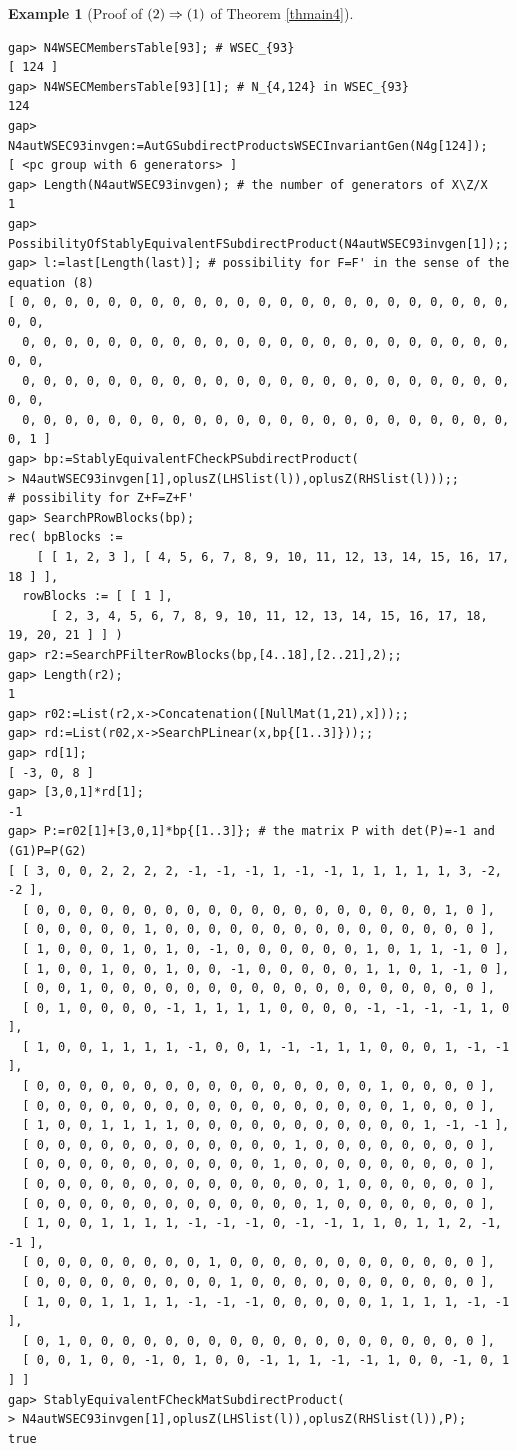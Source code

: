 \documentclass{amsart}
\theoremstyle{plain}
\theoremstyle{definition}
\newtheorem{example}[theorem]{Example}
\theoremstyle{remark}
\begin{document}
\begin{example}[Proof of ${\rm (2)}\Rightarrow {\rm (1)}$ of {Theorem \ref{thmain4}}]
\begin{verbatim}
gap> N4WSECMembersTable[93]; # WSEC_{93}
[ 124 ]
gap> N4WSECMembersTable[93][1]; # N_{4,124} in WSEC_{93}
124
gap> N4autWSEC93invgen:=AutGSubdirectProductsWSECInvariantGen(N4g[124]);
[ <pc group with 6 generators> ]
gap> Length(N4autWSEC93invgen); # the number of generators of X\Z/X
1
gap> PossibilityOfStablyEquivalentFSubdirectProduct(N4autWSEC93invgen[1]);;
gap> l:=last[Length(last)]; # possibility for F=F' in the sense of the equation (8)
[ 0, 0, 0, 0, 0, 0, 0, 0, 0, 0, 0, 0, 0, 0, 0, 0, 0, 0, 0, 0, 0, 0, 0, 0, 0, 
  0, 0, 0, 0, 0, 0, 0, 0, 0, 0, 0, 0, 0, 0, 0, 0, 0, 0, 0, 0, 0, 0, 0, 0, 0, 
  0, 0, 0, 0, 0, 0, 0, 0, 0, 0, 0, 0, 0, 0, 0, 0, 0, 0, 0, 0, 0, 0, 0, 0, 0, 
  0, 0, 0, 0, 0, 0, 0, 0, 0, 0, 0, 0, 0, 0, 0, 0, 0, 0, 0, 0, 0, 0, 0, 0, 1 ]
gap> bp:=StablyEquivalentFCheckPSubdirectProduct(
> N4autWSEC93invgen[1],oplusZ(LHSlist(l)),oplusZ(RHSlist(l)));;
# possibility for Z+F=Z+F'
gap> SearchPRowBlocks(bp);
rec( bpBlocks := 
    [ [ 1, 2, 3 ], [ 4, 5, 6, 7, 8, 9, 10, 11, 12, 13, 14, 15, 16, 17, 18 ] ],
  rowBlocks := [ [ 1 ], 
      [ 2, 3, 4, 5, 6, 7, 8, 9, 10, 11, 12, 13, 14, 15, 16, 17, 18, 19, 20, 21 ] ] )
gap> r2:=SearchPFilterRowBlocks(bp,[4..18],[2..21],2);;
gap> Length(r2);
1
gap> r02:=List(r2,x->Concatenation([NullMat(1,21),x]));;
gap> rd:=List(r02,x->SearchPLinear(x,bp{[1..3]}));;
gap> rd[1];
[ -3, 0, 8 ]
gap> [3,0,1]*rd[1];
-1
gap> P:=r02[1]+[3,0,1]*bp{[1..3]}; # the matrix P with det(P)=-1 and (G1)P=P(G2)
[ [ 3, 0, 0, 2, 2, 2, 2, -1, -1, -1, 1, -1, -1, 1, 1, 1, 1, 1, 3, -2, -2 ], 
  [ 0, 0, 0, 0, 0, 0, 0, 0, 0, 0, 0, 0, 0, 0, 0, 0, 0, 0, 0, 1, 0 ], 
  [ 0, 0, 0, 0, 0, 1, 0, 0, 0, 0, 0, 0, 0, 0, 0, 0, 0, 0, 0, 0, 0 ], 
  [ 1, 0, 0, 0, 1, 0, 1, 0, -1, 0, 0, 0, 0, 0, 0, 1, 0, 1, 1, -1, 0 ], 
  [ 1, 0, 0, 1, 0, 0, 1, 0, 0, -1, 0, 0, 0, 0, 0, 1, 1, 0, 1, -1, 0 ], 
  [ 0, 0, 1, 0, 0, 0, 0, 0, 0, 0, 0, 0, 0, 0, 0, 0, 0, 0, 0, 0, 0 ], 
  [ 0, 1, 0, 0, 0, 0, -1, 1, 1, 1, 1, 0, 0, 0, 0, -1, -1, -1, -1, 1, 0 ], 
  [ 1, 0, 0, 1, 1, 1, 1, -1, 0, 0, 1, -1, -1, 1, 1, 0, 0, 0, 1, -1, -1 ], 
  [ 0, 0, 0, 0, 0, 0, 0, 0, 0, 0, 0, 0, 0, 0, 0, 0, 1, 0, 0, 0, 0 ], 
  [ 0, 0, 0, 0, 0, 0, 0, 0, 0, 0, 0, 0, 0, 0, 0, 0, 0, 1, 0, 0, 0 ], 
  [ 1, 0, 0, 1, 1, 1, 1, 0, 0, 0, 0, 0, 0, 0, 0, 0, 0, 0, 1, -1, -1 ], 
  [ 0, 0, 0, 0, 0, 0, 0, 0, 0, 0, 0, 0, 1, 0, 0, 0, 0, 0, 0, 0, 0 ], 
  [ 0, 0, 0, 0, 0, 0, 0, 0, 0, 0, 0, 1, 0, 0, 0, 0, 0, 0, 0, 0, 0 ], 
  [ 0, 0, 0, 0, 0, 0, 0, 0, 0, 0, 0, 0, 0, 0, 1, 0, 0, 0, 0, 0, 0 ], 
  [ 0, 0, 0, 0, 0, 0, 0, 0, 0, 0, 0, 0, 0, 1, 0, 0, 0, 0, 0, 0, 0 ], 
  [ 1, 0, 0, 1, 1, 1, 1, -1, -1, -1, 0, -1, -1, 1, 1, 0, 1, 1, 2, -1, -1 ], 
  [ 0, 0, 0, 0, 0, 0, 0, 0, 1, 0, 0, 0, 0, 0, 0, 0, 0, 0, 0, 0, 0 ], 
  [ 0, 0, 0, 0, 0, 0, 0, 0, 0, 1, 0, 0, 0, 0, 0, 0, 0, 0, 0, 0, 0 ], 
  [ 1, 0, 0, 1, 1, 1, 1, -1, -1, -1, 0, 0, 0, 0, 0, 1, 1, 1, 1, -1, -1 ], 
  [ 0, 1, 0, 0, 0, 0, 0, 0, 0, 0, 0, 0, 0, 0, 0, 0, 0, 0, 0, 0, 0 ], 
  [ 0, 0, 1, 0, 0, -1, 0, 1, 0, 0, -1, 1, 1, -1, -1, 1, 0, 0, -1, 0, 1 ] ]
gap> StablyEquivalentFCheckMatSubdirectProduct(
> N4autWSEC93invgen[1],oplusZ(LHSlist(l)),oplusZ(RHSlist(l)),P);
true


\end{verbatim}
\end{example}
\end{document}
